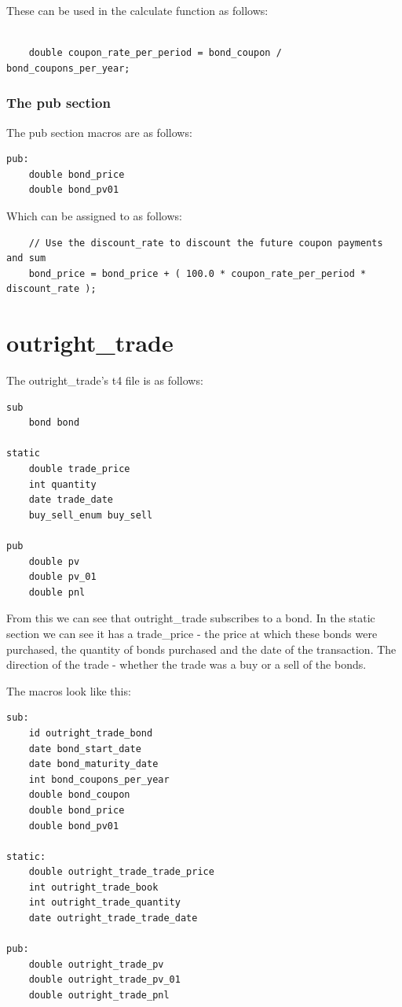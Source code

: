 \documentclass{report}
\begin{document}
These can be used in the calculate function as follows:

\begin{verbatim}

    double coupon_rate_per_period = bond_coupon / bond_coupons_per_year;

\end{verbatim}


\subsubsection{The pub section}

The pub section macros are as follows:

\begin{verbatim}
pub:
    double bond_price
    double bond_pv01

\end{verbatim}

Which can be assigned to as follows:

\begin{verbatim}
    // Use the discount_rate to discount the future coupon payments and sum
    bond_price = bond_price + ( 100.0 * coupon_rate_per_period * discount_rate );
\end{verbatim}

\section{outright_trade}

The outright_trade's t4 file is as follows:

\begin{verbatim}
sub
    bond bond

static
    double trade_price
    int quantity
    date trade_date
    buy_sell_enum buy_sell

pub
    double pv
    double pv_01
    double pnl
\end{verbatim}

From this we can see that outright_trade subscribes to a bond. In the static section we can see it has a trade_price - the price at which these bonds were purchased, the quantity of bonds purchased and the date of the transaction. The direction of the trade - whether the trade was a buy or a sell of the bonds.

The macros look like this:

\begin{verbatim}
sub:
    id outright_trade_bond
    date bond_start_date
    date bond_maturity_date
    int bond_coupons_per_year
    double bond_coupon
    double bond_price
    double bond_pv01

static:
    double outright_trade_trade_price
    int outright_trade_book
    int outright_trade_quantity
    date outright_trade_trade_date

pub:
    double outright_trade_pv
    double outright_trade_pv_01
    double outright_trade_pnl
\end{verbatim}
\end{document}
